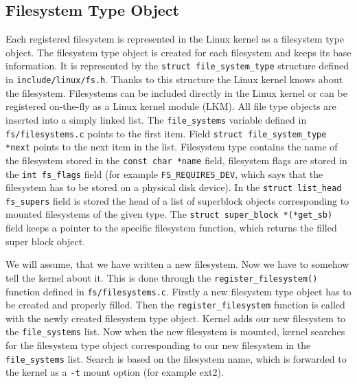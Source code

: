 \subsection{Filesystem Type Object}
\label{lab:file_system_type}
Each registered filesystem is represented in the Linux kernel as a filesystem type
object. The filesystem type object is created for each filesystem and keeps its base
information. It is represented by the \texttt{struct file\_system\_type} structure
defined in \texttt{include/linux/fs.h}. Thanks to this structure the Linux kernel knows about
the filesystem. Filesystems can be included directly in the Linux kernel or can be
registered on-the-fly as a Linux kernel module (LKM). All file type objects are inserted
into a simply linked list. The \texttt{file\_systems} variable defined in
\texttt{fs/filesystems.c} points to the first item. Field \texttt{struct
file\_system\_type *next} points to the next item in the list. Filesystem type
contains the name of the filesystem stored in the \texttt{const char *name} field, filesystem
flags are stored in the \texttt{int fs\_flags} field (for example
\texttt{FS\_REQUIRES\_DEV}, which says that the filesystem has to be stored on a
physical disk device). In the \texttt{struct list\_head fs\_supers} field is stored
the head of a list of superblock objects corresponding to mounted filesystems of the
given type. The \texttt{struct super\_block *(*get\_sb)} field keeps a pointer to the
specific filesystem function, which returns the filled super block object. 

We will assume, that we have written a new filesystem. Now we have to somehow tell the kernel about
it. This is done through the \texttt{register\_filesystem()} function defined in
\texttt{fs/filesystems.c}. Firstly a new filesystem type object has to be created and
properly filled. Then the \texttt{register\_filesystem} function is called with the newly
created filesystem type object. Kernel adds our new filesystem to the
\texttt{file\_systems} list. Now when the new filesystem is mounted, kernel searches
for the filesystem type object corresponding to our new filesystem in the
\texttt{file\_systems} list. Search is based on the filesystem name, which is
forwarded to the kernel as a \texttt{-t} mount option (for example ext2). 

